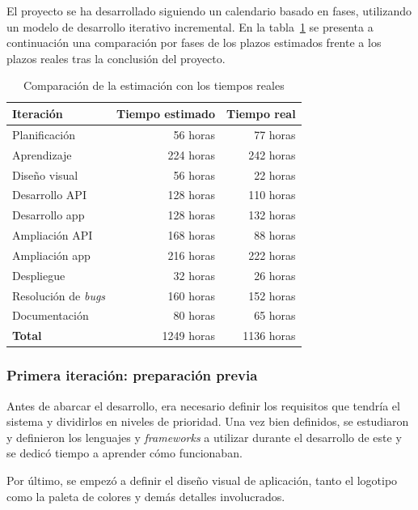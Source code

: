 \documentclass[a4paper,12pt]{article}
\begin{document}
El proyecto se ha desarrollado siguiendo un calendario basado en fases,
utilizando un modelo de desarrollo iterativo incremental. En la
tabla~\ref{tab:estimacion_tiempo} se presenta a continuación una comparación por
fases de los plazos estimados frente a los plazos reales tras la conclusión del
proyecto.

\begin{table}[hbtp]
  \centering
  \begin{tabular}{|l|r|r|}
    \hline
    \textbf{Iteración} & \textbf{Tiempo estimado} & \textbf{Tiempo real} \\
    \hline
    Planificación & 56 horas & 77 horas \\
    \hline
    Aprendizaje & 224 horas & 242 horas \\
    \hline
    Diseño visual & 56 horas & 22 horas \\
    \hline
    Desarrollo API & 128 horas & 110 horas \\
    \hline
    Desarrollo app & 128 horas & 132 horas \\
    \hline
    Ampliación API & 168 horas & 88 horas \\
    \hline
    Ampliación app & 216 horas & 222 horas \\
    \hline
    Despliegue & 32 horas & 26 horas \\
    \hline
    Resolución de \textit{bugs} & 160 horas & 152 horas \\
    \hline
    Documentación & 80 horas & 65 horas \\
    \hline
    \textbf{Total} & 1249 horas & 1136 horas \\
    \hline
  \end{tabular}
  \caption{Comparación de la estimación con los tiempos reales}
  \label{tab:estimacion_tiempo}
\end{table}


\subsubsection{Primera iteración: preparación previa}
\label{sec:primera_iteracion}

Antes de abarcar el desarrollo, era necesario definir los requisitos que tendría
el sistema y dividirlos en niveles de prioridad. Una vez bien definidos, se
estudiaron y definieron los lenguajes y \textit{frameworks} a utilizar durante
el desarrollo de este y se dedicó tiempo a aprender cómo funcionaban.

Por último, se empezó a definir el diseño visual de aplicación, tanto el
logotipo como la paleta de colores y demás detalles involucrados.
\end{document}
